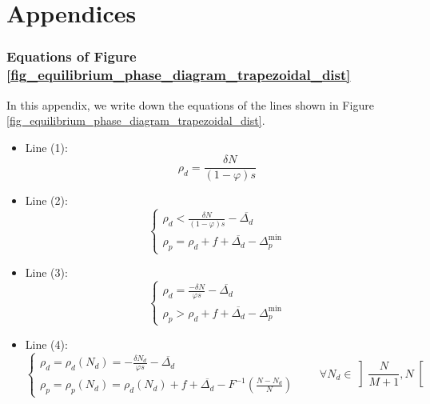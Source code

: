 \documentclass[english, a4paper]{article}
\theoremstyle{plain}
\theoremstyle{definition}
\theoremstyle{remark}
\begin{document}
\clearpage
\part{Appendices}
\appendix

\section{Equations of Figure \ref{fig_equilibrium_phase_diagram_trapezoidal_dist}}
\label{appendix_equation_of_phase_diagram}

In this appendix, we write down the equations of the lines shown in Figure \ref{fig_equilibrium_phase_diagram_trapezoidal_dist}.

\begin{itemize}
    \item Line (1):
    \begin{equation*}
        \rho_d = \frac{\delta N}{(1-\varphi)s}
    \end{equation*}

    \item Line (2):
    \begin{equation*}
        \left\{
        \begin{array}{l}
            \rho_d < \frac{\delta N}{(1 - \varphi)s} - \overline{\Delta _d}\\
            \rho_p = \rho_d + f + \overline{\Delta_d} - \Delta_p^{\text{min}}
        \end{array}
        \right.
    \end{equation*}

    \item Line (3):
    \begin{equation*}
        \left\{
        \begin{array}{l}
            \rho_d = \frac{-\delta N}{\varphi s} - \overline{\Delta_d}\\
            \rho_p > \rho_d + f + \overline{\Delta_d} - \Delta_p^{\text{min}}
        \end{array}
        \right.
    \end{equation*}

    \item Line (4):
    \begin{equation*}
        \left\{
        \begin{array}{l}
            \rho_d = \rho_d(N_d) = -\frac{\delta N_d}{\varphi s} - \overline{\Delta_d}\\
            \rho_p = \rho_p(N_d) = \rho_d(N_d) + f + \overline{\Delta_d} - F^{-1}\left( \frac{N - N_d}{N} \right)
        \end{array}
        \right. \qquad \forall N_d \in \left]\frac{N}{M+1}, N\right[
    \end{equation*}


\end{itemize}
\end{document}
